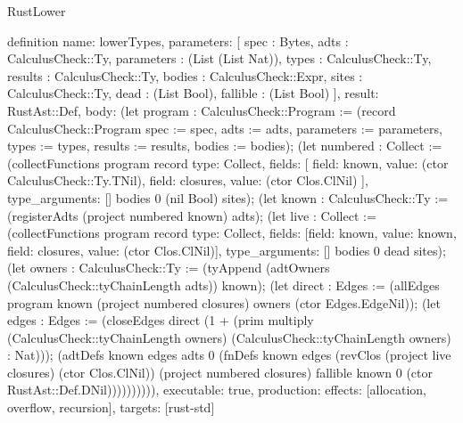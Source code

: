 \begin{lexlean}{RustLower}
\begin{semanticmodule}
definition{
  name: lowerTypes,
  parameters: [
    spec : Bytes,
    adts : CalculusCheck::Ty,
    parameters : (List (List Nat)),
    types : CalculusCheck::Ty,
    results : CalculusCheck::Ty,
    bodies : CalculusCheck::Expr,
    sites : CalculusCheck::Ty,
    dead : (List Bool),
    fallible : (List Bool)
  ],
  result: RustAst::Def,
  body: (let program : CalculusCheck::Program := (record CalculusCheck::Program {spec := spec, adts := adts, parameters := parameters, types := types, results := results, bodies := bodies}); (let numbered : Collect := (collectFunctions program record{
    type: Collect,
    fields: [
      {field: known, value: (ctor CalculusCheck::Ty.TNil)},
      {field: closures, value: (ctor Clos.ClNil)}
    ],
    type_arguments: []
  } bodies 0 (nil Bool) sites); (let known : CalculusCheck::Ty := (registerAdts (project numbered known) adts); (let live : Collect := (collectFunctions program record{
    type: Collect,
    fields: [{field: known, value: known}, {field: closures, value: (ctor Clos.ClNil)}],
    type_arguments: []
  } bodies 0 dead sites); (let owners : CalculusCheck::Ty := (tyAppend (adtOwners (CalculusCheck::tyChainLength adts)) known); (let direct : Edges := (allEdges program known (project numbered closures) owners (ctor Edges.EdgeNil)); (let edges : Edges := (closeEdges direct (1 + (prim multiply (CalculusCheck::tyChainLength owners) (CalculusCheck::tyChainLength owners) : Nat))); (adtDefs known edges adts 0 (fnDefs known edges (revClos (project live closures) (ctor Clos.ClNil)) (project numbered closures) fallible known 0 (ctor RustAst::Def.DNil)))))))))),
  executable: true,
  production: {effects: [allocation, overflow, recursion], targets: [rust-std]}
}
\end{semanticmodule}
\end{lexlean}

